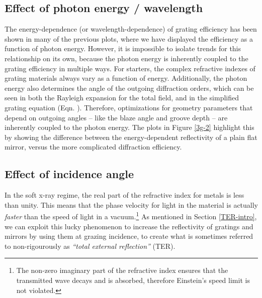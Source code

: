 \subsection{Effect of photon energy / wavelength}
The energy-dependence (or wavelength-dependence) of grating efficiency has been shown in many of the previous plots, where we have displayed the efficiency as a function of photon energy.  However, it is impossible to isolate trends for this relationship on its own, because the photon energy is inherently coupled to the grating efficiency in multiple ways.  For starters, the complex refractive indexes of grating materials always vary as a function of energy.  Additionally, the photon energy also determines the angle of the outgoing diffraction orders, which can be seen in both the Rayleigh expansion for the total field, and in the simplified grating equation (Eqn. ).  Therefore, optimizations for geometry parameters that depend on outgoing angles -- like the blaze angle and groove depth -- are inherently coupled to the photon energy.  The plots in Figure \ref{3g-2} highlight this by showing the difference between the energy-dependent reflectivity of a plain flat mirror, versus the more complicated diffraction efficiency.

\subsection{Effect of incidence angle}
\label{TER}
In the soft x-ray regime, the real part of the refractive index for metals is less than unity.  This means that the phase velocity for light in the material is actually \emph{faster} than the speed of light in a vacuum.\footnote{The non-zero imaginary part of the refractive index ensures that the transmitted wave decays and is absorbed, therefore Einstein's speed limit is not violated.}  As mentioned in Section \ref{TER-intro}, we can exploit this lucky phenomenon to increase the reflectivity of gratings and mirrors by using them at grazing incidence, to create what is sometimes referred to non-rigourously as \emph{``total external reflection''} (TER).

